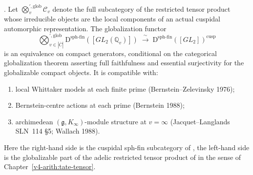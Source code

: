 \begin{theorem}
\label{v4-arith:w5-e:thm:LACD-cuspidal}
\ClaimStatusProvedHereConditional. Let
\(\bigotimes_{v}^{\prime,\mathrm{glob}}\mathcal{C}_{v}\) denote the
full subcategory of the restricted tensor product whose irreducible
objects are the local components of an actual cuspidal automorphic
representation. The globalization functor
\[
\bigotimes_{v\in|\overline{C}|}^{\prime,\mathrm{glob}}\mathrm{D}^{\mathrm{sph\text{-}fin}}([GL_{2}(\mathbb{Q}_{v})])
\;\xrightarrow{\;\sim\;}\;
\mathrm{D}^{\mathrm{sph\text{-}fin}}([GL_{2}])^{\mathrm{cusp}}
\]
is an equivalence on compact generators, conditional on the
categorical globalization theorem asserting full faithfulness and
essential surjectivity for the globalizable compact objects. It is
compatible with:
\begin{enumerate}
\item local Whittaker models at each finite prime
(Bernstein--Zelevinsky 1976);
\item Bernstein-centre actions at each prime (Bernstein 1988);
\item archimedean \((\mathfrak{g},K_{\infty})\)-module structure at
\(v=\infty\) (Jacquet--Langlands SLN~114 \S 5; Wallach 1988).
\end{enumerate}
Here the right-hand side is the cuspidal sph-fin subcategory of
, the left-hand side is
the globalizable part of the adelic restricted tensor product of
 in the sense of
Chapter~\ref{v4-arith:tate-tensor}.
\end{theorem}

